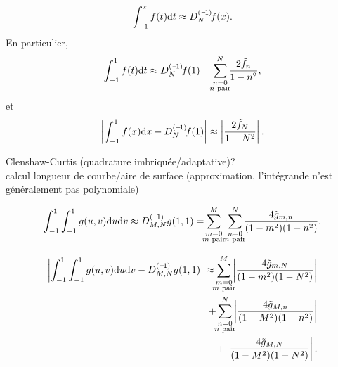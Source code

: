 \begin{equation}
	\int_{-1}^{x} f(t) \dx{t} 
	\approx \interpprim{f}{N}(x).
\end{equation}
En particulier,
\begin{equation}
	\int_{-1}^{1} f(t) \dx{t} 
	\approx 
	\interpprim{f}{N}(1)
	=
	\sum_{\mathclap{\substack{n = 0\\n \text{ pair}}}}^{N} \frac{2 \tilde{f}_n}{1 - n^2},
\end{equation}
et
\begin{equation}
	\left| \int_{-1}^{1} f(x) \dx{x} - \interpprim{f}{N}(1) \right|
	\approx
	\left|\frac{2 \tilde{f}_{N}}{1 - N^2}\right|.
\end{equation}

Clenshaw-Curtis (quadrature imbriquée/adaptative)?\\
calcul longueur de courbe/aire de surface (approximation, l'intégrande n'est généralement pas polynomiale)

\begin{equation}
	\int_{-1}^{1} \int_{-1}^{1} g(u,v) \dx{u} \dx{v}
	\approx 
	\interpprim{\,g}{M,N}(1,1)
	=
	\sum_{\mathclap{\substack{m = 0\\m \text{ pair}}}}^{M}
	\;\;
	\sum_{\mathclap{\substack{n = 0\\n \text{ pair}}}}^{N} 
	\frac{4 \tilde{g}_{m,n}}{(1 - m^2)(1 - n^2)},
\end{equation}

\begin{align}
	\left| \int_{-1}^{1} \int_{-1}^{1} g(u,v) \dx{u}\dx{v} - \interpprim{\,g}{M,N}(1,1) \right|
	\approx
	\sum_{\mathclap{\substack{m = 0\\m \text{ pair}}}}^{M} \left| \frac{4 \tilde{g}_{m,N}}{(1 - m^2)(1 - N^2)} \right| \nonumber\\ + 
	\sum_{\mathclap{\substack{n = 0\\n \text{ pair}}}}^{N} \left| \frac{4 \tilde{g}_{M,n}}{(1 - M^2)(1 - n^2)} \right| \nonumber\\ +
	\left| \frac{4 \tilde{g}_{M,N}}{(1 - M^2)(1 - N^2)} \right|.
\end{align}


